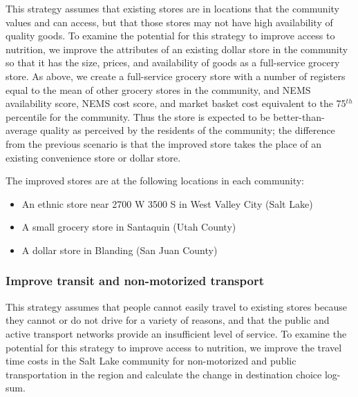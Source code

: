\documentclass[
  letterpaper,
  number,
  review,
  doubleblind,
  3p]{elsarticle}
\providecommand{\tightlist}{%
  \setlength{\itemsep}{0pt}\setlength{\parskip}{0pt}}\usepackage{longtable,booktabs,array}
\begin{document}
This strategy assumes that existing stores are in locations that the
community values and can access, but that those stores may not have high
availability of quality goods. To examine the potential for this
strategy to improve access to nutrition, we improve the attributes of an
existing dollar store in the community so that it has the size, prices,
and availability of goods as a full-service grocery store. As above, we
create a full-service grocery store with a number of registers equal to
the mean of other grocery stores in the community, and NEMS availability
score, NEMS cost score, and market basket cost equivalent to the
75\(^{th}\) percentile for the community. Thus the store is expected to
be better-than-average quality as perceived by the residents of the
community; the difference from the previous scenario is that the
improved store takes the place of an existing convenience store or
dollar store.

The improved stores are at the following locations in each community:

\begin{itemize}
\tightlist
\item
  An ethnic store near 2700 W 3500 S in West Valley City (Salt Lake)
\item
  A small grocery store in Santaquin (Utah County)
\item
  A dollar store in Blanding (San Juan County)
\end{itemize}

\subsubsection{Improve transit and non-motorized
transport}\label{improve-transit-and-non-motorized-transport}

This strategy assumes that people cannot easily travel to existing
stores because they cannot or do not drive for a variety of reasons, and
that the public and active transport networks provide an insufficient
level of service. To examine the potential for this strategy to improve
access to nutrition, we improve the travel time costs in the Salt Lake
community for non-motorized and public transportation in the region and
calculate the change in destination choice log-sum.
\end{document}
